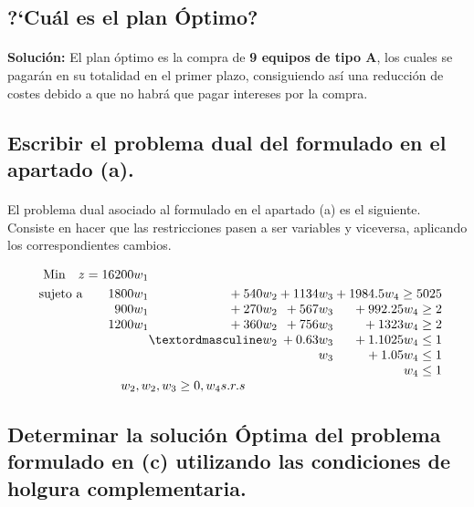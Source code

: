 \documentclass[10pt, a4paper]{article}
\begin{document}
		\subsection{?`Cuál es el plan Óptimo?}

			\paragraph{}
			\textbf{Solución:} El plan óptimo es la compra de \textbf{9 equipos de tipo A}, los cuales se pagarán en su totalidad en el primer plazo, consiguiendo así una reducción de costes debido a que no habrá que pagar intereses por la compra.

		\subsection{Escribir el problema dual del formulado en el apartado (a).}

			\paragraph{}
			El problema dual asociado al formulado en el apartado (a) es el siguiente. Consiste en hacer que las restricciones pasen a ser variables y viceversa, aplicando los correspondientes cambios.

			\[
			  \begin{array}{r@{}r@{}r@{}r@{}l}
			    \text{Min} \quad z = 16200w_{1} \\[\jot]
			    \text{sujeto a}\qquad 	1800w_{1} 	&{}+540w_{2}&{}	+1134w_{3} 		&{} +1984.5w_{4} 	\geq 5025 \\
			                     		900w_{1} 	&{}+270w_{2}&{}	+567w_{3} 		&{} +992.25w_{4}	\geq 2 \\
								 		1200w_{1} 	&{}+360w_{2}&{} +756w_{3}		&{} +1323w_{4}		\geq 2 \\
								 		  			&{}º   w_{2}&{} +0.63w_{3}		&{} +1.1025w_{4}	\leq 1  \\
								 		  			&{} 		&{} 	w_{3}		&{} +1.05w_{4}		\leq 1 \\
										    		&{} 		&{} 				&{} w_{4} 			\leq 1 \\
			     \multicolumn{3}{c}{ w_{2},w_{2},w_{3} \geq 0,  w_{4} s.r.s}
			  \end{array}
			\]


		\subsection{Determinar la solución Óptima del problema formulado en (c) utilizando las condiciones de holgura complementaria.}
\end{document}
